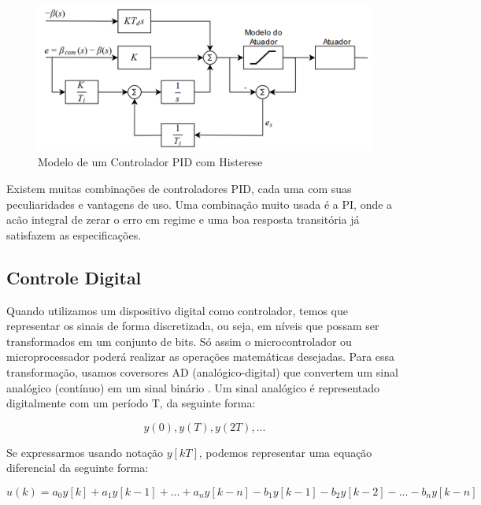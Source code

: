 \begin{figure}[H]
  \caption{Modelo de um Controlador PID com Histerese}
  \begin{center}
      \includegraphics[scale=0.55]{referencial/img/pid_antiwindup_astrom_p83}
  \end{center}
  \label{fig:pid_antiwindup_astrom_p83}
\end{figure}

Existem muitas combinações de controladores PID, cada uma com suas peculiaridades e vantagens de uso. Uma combinação muito usada é a PI, onde a acão integral de zerar o erro em regime e uma boa resposta transitória já satisfazem as especificações. 



\subsection{Controle Digital}

Quando utilizamos um dispositivo digital como controlador, temos que representar os sinais de forma discretizada, ou seja, em níveis que possam ser transformados em um conjunto de bits. Só assim o microcontrolador ou microprocessador poderá realizar as operações matemáticas desejadas. Para essa transformação, usamos coversores AD (analógico-digital) que convertem um sinal analógico (contínuo) em um sinal binário \cite{BongWie2001}. Um sinal analógico é representado digitalmente com um período T, da seguinte forma:

\begin{equation}
  y(0), y(T), y(2T), ...
\end{equation}

Se expressarmos usando notação ${y[kT]}$, podemos representar uma equação diferencial da seguinte forma:

\begin{equation}
  u(k) = a_{0}y[k]+a_{1}y[k-1]+...+a_{n}y[k-n] - b_{1}y[k-1] - b_{2}y[k-2] - ... -b_{n}y[k-n]
\end{equation}

